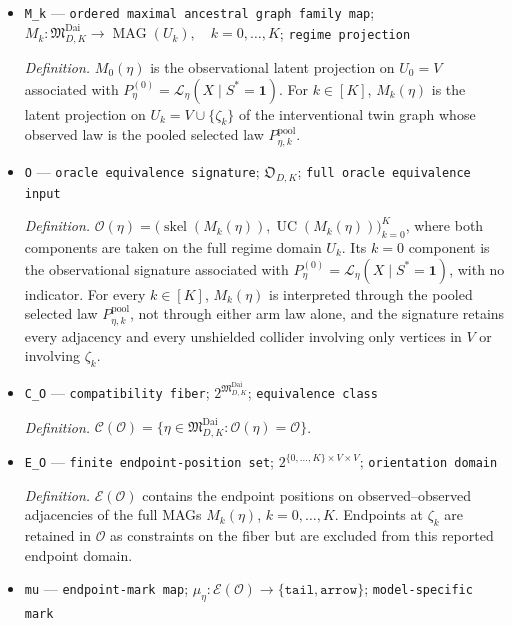\documentclass{article}
\begin{document}
\begin{itemize}
  \item \texttt{M\_\allowbreak{}k} --- \texttt{ordered maximal ancestral graph family map}; \(M_k:\mathfrak M_{D,K}^{\mathrm{Dai}}\to\operatorname{MAG}(U_k),\quad k=0,\ldots,K\); \texttt{regime projection}
  \par\smallskip\noindent\emph{Definition.} \(M_0(\eta)\) is the observational latent projection on \(U_0=V\) associated with \(P_{\eta}^{(0)}=\mathcal L_{\eta}(X\mid S^*=\mathbf 1)\). For \(k\in[K]\), \(M_k(\eta)\) is the latent projection on \(U_k=V\cup\{\zeta_k\}\) of the interventional twin graph whose observed law is the pooled selected law \(P_{\eta,k}^{\mathrm{pool}}\).
  \item \texttt{O} --- \texttt{oracle equivalence signature}; \(\mathfrak O_{D,K}\); \texttt{full oracle equivalence input}
  \par\smallskip\noindent\emph{Definition.} \(\mathcal O(\eta)=\bigl(\operatorname{skel}(M_k(\eta)),\operatorname{UC}(M_k(\eta))\bigr)_{k=0}^{K}\), where both components are taken on the full regime domain \(U_k\). Its \(k=0\) component is the observational signature associated with \(P_{\eta}^{(0)}=\mathcal L_{\eta}(X\mid S^*=\mathbf 1)\), with no indicator. For every \(k\in[K]\), \(M_k(\eta)\) is interpreted through the pooled selected law \(P_{\eta,k}^{\mathrm{pool}}\), not through either arm law alone, and the signature retains every adjacency and every unshielded collider involving only vertices in \(V\) or involving \(\zeta_k\).
  \item \texttt{C\_\allowbreak{}O} --- \texttt{compatibility fiber}; \(2^{\mathfrak M_{D,K}^{\mathrm{Dai}}}\); \texttt{equivalence class}
  \par\smallskip\noindent\emph{Definition.} \(\mathcal C(\mathcal O)=\{\eta\in\mathfrak M_{D,K}^{\mathrm{Dai}}:\mathcal O(\eta)=\mathcal O\}\).
  \item \texttt{E\_\allowbreak{}O} --- \texttt{finite endpoint-\allowbreak{}position set}; \(2^{\{0,\ldots,K\}\times V\times V}\); \texttt{orientation domain}
  \par\smallskip\noindent\emph{Definition.} \(\mathcal E(\mathcal O)\) contains the endpoint positions on observed--observed adjacencies of the full MAGs \(M_k(\eta)\), \(k=0,\ldots,K\). Endpoints at \(\zeta_k\) are retained in \(\mathcal O\) as constraints on the fiber but are excluded from this reported endpoint domain.
  \item \texttt{mu} --- \texttt{endpoint-\allowbreak{}mark map}; \(\mu_\eta:\mathcal E(\mathcal O)\to\{\mathtt{tail},\mathtt{arrow}\}\); \texttt{model-\allowbreak{}specific mark}

\end{itemize}
\end{document}
